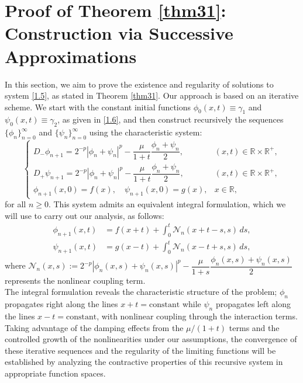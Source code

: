 \documentclass[
  sn-mathphys-num,
  colorlinks,
  linkcolor=darkmagenta,
  citecolor=rufous,
  urlcolor=zaffre,
  hypertexnames=false
]{sn-jnl}
\numberwithin{equation}{section}
\begin{document}
\section{Proof of Theorem \texorpdfstring{\ref{thm31}}{Theorem 1}: Construction via Successive Approximations}\label{sec4}
In this section, we aim to prove the existence and regularity of solutions to system \eqref{1.5}, as stated in Theorem \ref{thm31}. Our approach is based on an iterative scheme. We start with the constant initial functions $\phi_0(x,t) \equiv \gamma_1$ and $\psi_0(x,t) \equiv \gamma_2$, as given in \eqref{1.6}, and then construct recursively the sequences $\{\phi_n\}_{n=0}^\infty$ and $\{\psi_n\}_{n=0}^\infty$ using the characteristic system:
\begin{equation}
\label{2.1}
\begin{cases}
D_- \phi_{n+1} = 2^{-p}|\phi_n + \psi_n|^p - \dfrac{\mu}{1 + t} \dfrac{\phi_n + \psi_n}{2}, & (x,t) \in \mathbb{R} \times \mathbb{R}^+, \\
D_+ \psi_{n+1} = 2^{-p}|\phi_n + \psi_n|^p - \dfrac{\mu}{1 + t} \dfrac{\phi_n + \psi_n}{2}, & (x,t) \in \mathbb{R} \times \mathbb{R}^+, \\
\phi_{n+1}(x, 0) = f(x), \quad \psi_{n+1}(x, 0) = g(x), & x \in \mathbb{R},
\end{cases}
\end{equation}
for all $n \geq 0$. This system admits an equivalent integral formulation, which we will use to carry out our analysis, as follows:
\begin{equation}
\label{2.2}
\begin{aligned}
\phi_{n+1}(x,t) &= f(x+t) + \int_0^t \mathcal{N}_n(x+t-s,s)\,ds, \\
\psi_{n+1}(x,t) &= g(x-t) + \int_0^t \mathcal{N}_n(x-t+s,s)\,ds,
\end{aligned}
\end{equation}
where $\mathcal{N}_n(x,s) := 2^{-p}|\phi_n(x,s) + \psi_n(x,s)|^p - \dfrac{\mu}{1+s}\dfrac{\phi_n(x,s) + \psi_n(x,s)}{2}$ represents the nonlinear coupling term.\\
The integral formulation reveals the characteristic structure of the problem; $\phi_n$ propagates right along the lines $x+t = \text{constant}$ while $\psi_n$ propagates left along the lines $x-t = \text{constant}$, with nonlinear coupling through the interaction terms. Taking advantage of the damping effects from the $\mu/(1+t)$ terms and the controlled growth of the nonlinearities under our assumptions, the convergence of these iterative sequences and the regularity of the limiting functions will be established by analyzing the contractive properties of this recursive system in appropriate function spaces.  
\end{document}

